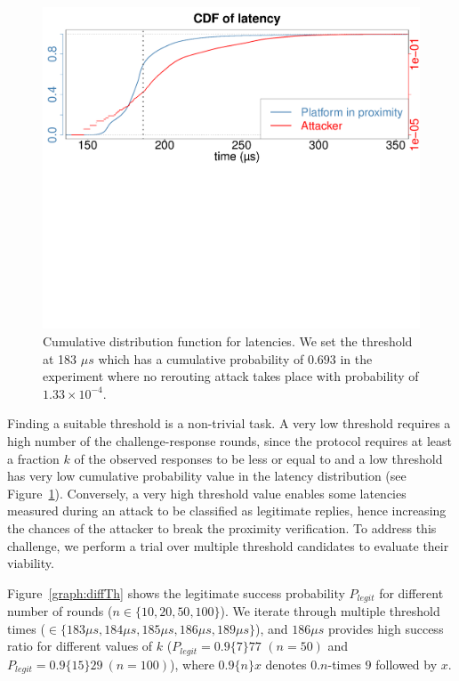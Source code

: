 \begin{figure}[t]
  \centering
    \includegraphics[trim={0 15cm 0 0}, clip, width=\linewidth]{data/fx3_data/CDF_N.pdf}
    \caption{Cumulative distribution function for latencies. We set the threshold \connect at 183 $\mu s$ which has a cumulative probability of $0.693$ in the experiment where no rerouting attack takes place with probability of $1.33\times10^{-4}$.}
    \vspace{-10pt}
    \label{fig:cdf}
\end{figure}


 Finding a suitable threshold \connect is a non-trivial task. A very low threshold requires a high number of the challenge-response rounds, since the protocol requires at least a fraction $k$ of the observed responses to be less or equal to \connect and a low threshold has very low cumulative probability value in the latency distribution (see Figure~\ref{fig:cdf}). Conversely, a very high threshold value enables some latencies measured during an attack to be classified as legitimate replies, hence increasing the chances of the attacker to break the proximity verification. To address this challenge, we perform a trial over multiple threshold candidates to evaluate their viability.


Figure~\ref{graph:diffTh} shows the legitimate success probability $P_{legit}$ for different number of rounds ($n\in\{10,20,50,100\}$). We iterate through multiple threshold times (\connect$\in\{183\mu s,184\mu s,185\mu s, 186\mu s, 189\mu s\}$), and $186\mu s$ provides high success ratio for different values of $k$ ($P_{legit}=0.9\{7\}77$ $(n=50)$ and $P_{legit}=0.9\{15\}29\ (n=100)$), where $0.9\{n\}x$ denotes $0.n$-times $9$ followed by $x$.

